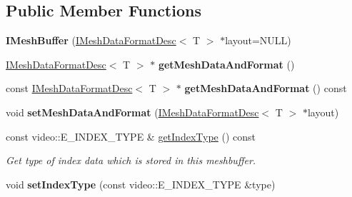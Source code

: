 \subsection*{Public Member Functions}
\begin{DoxyCompactItemize}
\item 
{\bfseries I\+Mesh\+Buffer} (\hyperlink{classirr_1_1scene_1_1IMeshDataFormatDesc}{I\+Mesh\+Data\+Format\+Desc}$<$ T $>$ $\ast$layout=N\+U\+LL)\hypertarget{classirr_1_1scene_1_1IMeshBuffer_a0f66dafa934fc63e83958c2f73ff796e}{}\label{classirr_1_1scene_1_1IMeshBuffer_a0f66dafa934fc63e83958c2f73ff796e}

\item 
\hyperlink{classirr_1_1scene_1_1IMeshDataFormatDesc}{I\+Mesh\+Data\+Format\+Desc}$<$ T $>$ $\ast$ {\bfseries get\+Mesh\+Data\+And\+Format} ()\hypertarget{classirr_1_1scene_1_1IMeshBuffer_a416c8e972e84063a02878a269a943b8e}{}\label{classirr_1_1scene_1_1IMeshBuffer_a416c8e972e84063a02878a269a943b8e}

\item 
const \hyperlink{classirr_1_1scene_1_1IMeshDataFormatDesc}{I\+Mesh\+Data\+Format\+Desc}$<$ T $>$ $\ast$ {\bfseries get\+Mesh\+Data\+And\+Format} () const \hypertarget{classirr_1_1scene_1_1IMeshBuffer_af9bc1d32d27767c33d63d2d117592791}{}\label{classirr_1_1scene_1_1IMeshBuffer_af9bc1d32d27767c33d63d2d117592791}

\item 
void {\bfseries set\+Mesh\+Data\+And\+Format} (\hyperlink{classirr_1_1scene_1_1IMeshDataFormatDesc}{I\+Mesh\+Data\+Format\+Desc}$<$ T $>$ $\ast$layout)\hypertarget{classirr_1_1scene_1_1IMeshBuffer_ac607c17b7935e1d44b7f3d7c0ed6e94f}{}\label{classirr_1_1scene_1_1IMeshBuffer_ac607c17b7935e1d44b7f3d7c0ed6e94f}

\item 
const video\+::\+E\+\_\+\+I\+N\+D\+E\+X\+\_\+\+T\+Y\+PE \& \hyperlink{classirr_1_1scene_1_1IMeshBuffer_a5b01c80eb695dfa21f21220d759539ea}{get\+Index\+Type} () const 
\begin{DoxyCompactList}\small\item\em Get type of index data which is stored in this meshbuffer. \end{DoxyCompactList}\item 
void {\bfseries set\+Index\+Type} (const video\+::\+E\+\_\+\+I\+N\+D\+E\+X\+\_\+\+T\+Y\+PE \&type)\hypertarget{classirr_1_1scene_1_1IMeshBuffer_a037c8dd0425f71ac1901a2a78529fa22}{}\label{classirr_1_1scene_1_1IMeshBuffer_a037c8dd0425f71ac1901a2a78529fa22}


\end{DoxyCompactItemize}
